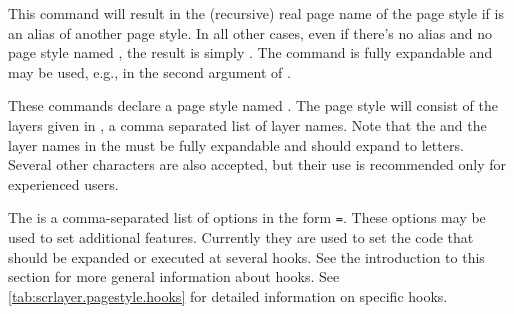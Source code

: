 \begin{Declaration}
\end{Declaration}
%
%
This command will result in the (recursive) real page name of the page style
if  is an alias of another page style. In all other
cases, even if there's no alias and no page style named , the result is simply . The command is fully
expandable and may be used, e.g., in the second argument of .%
\EndIndexGroup


\begin{Declaration}
\end{Declaration}
%
%
These commands declare a page style named . The page
style will consist of the layers given in , a comma
separated list of layer names. Note that the  and the layer names in the  must be fully
expandable and should expand to letters. Several other characters are also
accepted, but their use is recommended only for experienced users.

The  is a comma-separated list of options in the form
\texttt{=}. These options may be used to set
additional features. Currently they are used to set the code that should be
expanded or executed at several hooks. See the introduction to
this section for more general information about hooks. See
\autoref{tab:scrlayer.pagestyle.hooks} for detailed information on specific
hooks.

